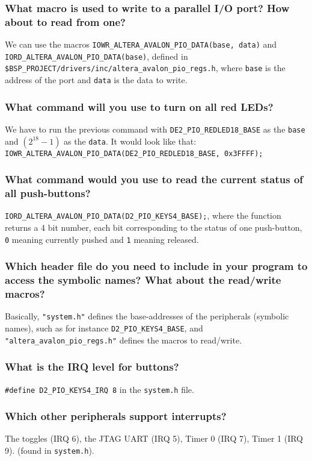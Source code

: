 \documentclass[a4paper,10pt]{article}
\begin{document}
\setcounter{subsection}{3}
\setcounter{subsubsection}{0}


\subsubsection{What macro is used to write to a parallel I/O port? How about to read from one?}

We can use the macros \texttt{IOWR\_ALTERA\_AVALON\_PIO\_DATA(base, data)} and  \texttt{IORD\_ALTERA\_AVALON\_PIO\_DATA(base)}, defined in \texttt{\$BSP\_PROJECT/drivers/inc/altera\_avalon\_pio\_regs.h}, where \texttt{base} is the address of the port and \texttt{data} is the data to write.

\subsubsection{What command will you use to turn on all red LEDs?}

We have to run the previous command with \texttt{DE2\_PIO\_REDLED18\_BASE} as the \texttt{base} and $(2^{18}-1)$ as the \texttt{data}.
It would look like that: \texttt{IOWR\_ALTERA\_AVALON\_PIO\_DATA(DE2\_PIO\_REDLED18\_BASE, 0x3FFFF);}

\subsubsection{What command would you use to read the current status of all push-buttons?}

\texttt{IORD\_ALTERA\_AVALON\_PIO\_DATA(D2\_PIO\_KEYS4\_BASE);}, where the function returns a 4 bit number, each bit corresponding to the status of one push-button, \texttt{0} meaning currently pushed and \texttt{1} meaning released. 

\subsubsection{Which header file do you need to include in your program to access the symbolic names? What about the read/write macros?}

Basically, \texttt{"system.h"} defines the base-addresses of the peripherals (symbolic names), such as for instance \texttt{D2\_PIO\_KEYS4\_BASE}, and \texttt{"altera\_avalon\_pio\_regs.h"} defines the macros to read/write.

\setcounter{subsection}{6}
\setcounter{subsubsection}{0}
\subsubsection{What is the IRQ level for buttons?}

\texttt{\#define D2\_PIO\_KEYS4\_IRQ 8} in the \texttt{system.h} file.

\subsubsection{Which other peripherals support interrupts?}

The toggles (IRQ 6), the JTAG UART (IRQ 5), Timer 0 (IRQ 7), Timer 1 (IRQ 9).
(found in \texttt{system.h}).




    
\end{document}
